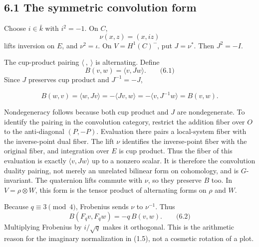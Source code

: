 \documentclass[
  11pt,
  a4paper,
]{article}
\begin{document}
\subsection{6.1 The symmetric convolution
form}\label{the-symmetric-convolution-form}

Choose \(i\in\bar k\) with \(i^2=-1\). On \(C\), \[
\nu(x,z)=(x,iz)
\] lifts inversion on \(E\), and \(\nu^2=\iota\). On \(V=H^1(C)^-\), put
\(J=\nu^*\). Then \(J^2=-I\).

The cup-product pairing \(\langle\ ,\ \rangle\) is alternating. Define
\[
B(v,w)=\langle v,Jw\rangle.
\qquad \text{(6.1)}
\] Since \(J\) preserves cup product and \(J^{-1}=-J\),

\[
B(w,v)=\langle w,Jv\rangle
=-\langle Jv,w\rangle
=-\langle v,J^{-1}w\rangle=B(v,w).
\]

Nondegeneracy follows because both cup product and \(J\) are
nondegenerate. To identify the pairing in the convolution category,
restrict the addition fiber over \(O\) to the anti-diagonal \((P,-P)\).
Evaluation there pairs a local-system fiber with the inverse-point dual
fiber. The lift \(\nu\) identifies the inverse-point fiber with the
original fiber, and integration over \(E\) is cup product. Thus the
fiber of this evaluation is exactly \(\langle v,Jw\rangle\) up to a
nonzero scalar. It is therefore the convolution duality pairing, not
merely an unrelated bilinear form on cohomology, and is \(G\)-invariant.
The quaternion lifts commute with \(\nu\), so they preserve \(B\) too.
In \(V=\rho\otimes W\), this form is the tensor product of alternating
forms on \(\rho\) and \(W\).

Because \(q\equiv3\pmod4\), Frobenius sends \(\nu\) to \(\nu^{-1}\).
Thus \[
B(F_qv,F_qw)=-q\,B(v,w).
\qquad \text{(6.2)}
\] Multiplying Frobenius by \(i/\sqrt q\) makes it orthogonal. This is
the arithmetic reason for the imaginary normalization in (1.5), not a
cosmetic rotation of a plot.
\end{document}
